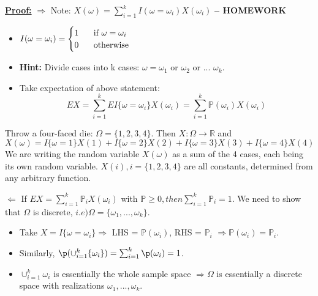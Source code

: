 \underline{\textbf{Proof:}} $\Rightarrow$ Note: $X(\omega) = \sum_{i=1}^kI(\omega=\omega_i)X(\omega_i)$ \textbf{ -- HOMEWORK}
\begin{itemize}
    \item $I(\omega = \omega_i) = \begin{cases}
        1 \hspace{0.5cm} \text{ if }\omega = \omega_i \\
        0 \hspace{0.5cm} \text{ otherwise}
    \end{cases}$
    \item \textbf{Hint:} Divide cases into k cases: $\omega = \omega_1$ or $\omega_2$ or ... $\omega_k$.
    \item Take expectation of above statement:
    \begin{equation*}
        EX = \sum_{i=1}^kEI\{\omega=\omega_i\}X(\omega_i) = \sum_{i=1}^k\mathbb{P}(\omega_i)X(\omega_i)
    \end{equation*}
\end{itemize}
\begin{exmp}
    Throw a four-faced die: $\Omega = \{1, 2, 3, 4\}$. Then $X: \Omega \rightarrow \mathbb{R}$ and
    \begin{equation*}
        X(\omega) = I\{\omega=1\}X(1) + I\{\omega=2\}X(2) + I\{\omega=3\}X(3) + I\{\omega=4\}X(4) 
    \end{equation*}
    We are writing the random variable $X(\omega)$ as a sum of the 4 cases, each being its own random variable. $X(i), i=\{1, 2, 3, 4\}$ are all constants, determined from any arbitrary function.
\end{exmp}

$\Leftarrow$ If $EX = \sum_{i=1}^k\mathbb{P}_iX(\omega_i)$ with $\mathbb{P} \geq 0, then \sum_{i=1}^k\mathbb{P}_i = 1$. We need to show that $\Omega$ is discrete, $i.e) \Omega = \{\omega_1, ..., \omega_k\}$.

\begin{itemize}
    \item Take $X = I\{\omega = \omega_i\} \Longrightarrow$ LHS = $\mathbb{P}(\omega_i)$, RHS = $\mathbb{P}_i$ $\Longrightarrow \mathbb{P}(\omega_i) = \mathbb{P}_i$.
    \item Similarly, $\p(\cup_{i=1}^k\{\omega_i\}) = \sum_{i=1}^k\p(\omega_i) = 1$.
    \item $\cup_{i=1}^k\omega_i$ is essentially the whole sample space $\Longrightarrow \Omega$ is essentially a discrete space with realizations $\omega_1, ..., \omega_k$.
\end{itemize}

